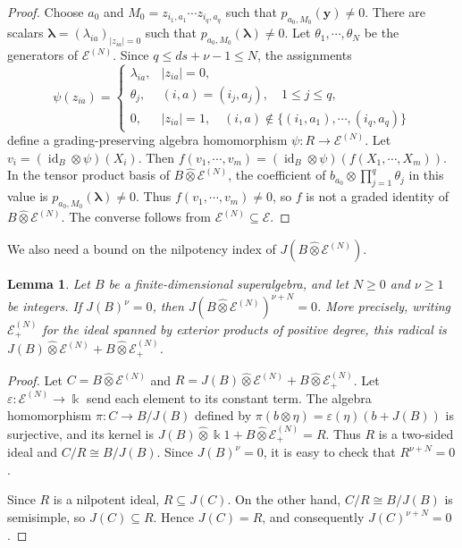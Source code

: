 \documentclass[11pt,reqno]{amsart}
\newcommand{\kk}{\Bbbk}
\newcommand{\E}{\mathcal E}
\newtheorem{lemma}[theorem]{Lemma}
\theoremstyle{definition}
\theoremstyle{remark}
\numberwithin{equation}{section}
\begin{document}
\begin{proof}
Choose $a_0$ and
$M_0=z_{i_1,a_1}\cdots z_{i_q,a_q}$ such that
$p_{a_0,M_0}(\mathbf y)\ne0$.
There are scalars
$\boldsymbol\lambda=(\lambda_{ia})_{|z_{ia}|=0}$ such that
$p_{a_0,M_0}(\boldsymbol\lambda)\ne0$.
Let $\theta_1,\cdots,\theta_N$ be the generators of
$\E^{(N)}$.
Since $q\leq ds+\nu-1\leq N$, the assignments
\[
\psi(z_{ia})=
\begin{cases}
\lambda_{ia},
  & |z_{ia}|=0,\\
\theta_j,
  & (i,a)=(i_j,a_j),\quad 1\leq j\leq q,\\
0,
  & |z_{ia}|=1,\quad
    (i,a)\notin\{(i_1,a_1),\cdots,(i_q,a_q)\}
\end{cases}
\]
define a grading-preserving algebra homomorphism
$\psi:R\to\E^{(N)}$.
Let $v_i=(\operatorname{id}_B\otimes\psi)(X_i)$.
Then
$
f(v_1,\cdots,v_m)
=
(\operatorname{id}_B\otimes\psi)
(f(X_1,\cdots,X_m))$.
In the tensor product basis of $B\mathbin{\widehat{\otimes}}\E^{(N)}$,
the coefficient of
$b_{a_0}\otimes \prod_{j=1}^q\theta_j$
in this value is
$p_{a_0,M_0}(\boldsymbol\lambda)\ne0$.
Thus $f(v_1,\cdots,v_m)\ne0$, so $f$ is not a graded
identity of $B\mathbin{\widehat{\otimes}}\E^{(N)}$.
The converse follows from $\E^{(N)}\subseteq\E$.

\end{proof}

We also need a bound on the nilpotency index of
$J(B\mathbin{\widehat{\otimes}}\E^{(N)})$.

\begin{lemma}\label{lem:tensor-radical}
Let $B$ be a finite-dimensional superalgebra, and let $N\geq0$ and $\nu\geq1$ be integers. If $J(B)^\nu=0$, then
$
J(B\mathbin{\widehat{\otimes}}\E^{(N)})^{\nu+N}=0$.
More precisely, writing $\E^{(N)}_+$ for the ideal spanned by
exterior products of positive degree, this radical is
$
J(B)\mathbin{\widehat{\otimes}}\E^{(N)}
  +B\mathbin{\widehat{\otimes}}\E^{(N)}_+$.
\end{lemma}


\begin{proof}
Let $C=B\mathbin{\widehat{\otimes}}\E^{(N)}$ and $
R=
J(B)\mathbin{\widehat{\otimes}}\E^{(N)}
+B\mathbin{\widehat{\otimes}}\E^{(N)}_+$.
Let $\varepsilon:\E^{(N)}\to\kk$ send each element to its
constant term. The algebra homomorphism $
\pi:C\longrightarrow B/J(B)$ defined by 
$
\pi(b\otimes\eta)=\varepsilon(\eta)(b+J(B))$ 
is surjective, and 
its kernel is
$J(B)\mathbin{\widehat{\otimes}}\kk1
+B\mathbin{\widehat{\otimes}}\E^{(N)}_+=R$.
Thus $R$ is a two-sided ideal and $C/R\cong B/J(B)$. Since $J(B)^\nu=0$, it is easy to check that  $R^{\nu+N}=0$.



Since $R$ is a nilpotent ideal, $R\subseteq J(C)$.
On the other hand, $C/R\cong B/J(B)$ is semisimple,
so $J(C)\subseteq R$.
Hence $J(C)=R$, and consequently $J(C)^{\nu+N}=0$.
\end{proof}
\end{document}
